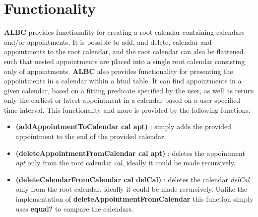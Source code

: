 \documentclass{IOS-Book-Article}
\begin{document}
\section{Functionality} \label{sec:functionality}
\textbf{ALBC} provides functionality for creating a root calendar containing calendars and/or appointments. It is possible to add, and delete, calendar and appointments to the root calendar, and the root calendar can also be flattened such that nested appointments are placed into a single root calendar consisting only of appointments. 
\textbf{ALBC} also provides functionality for presenting the appointments in a calendar within a html table. It can find appointments in a given calendar, based on a fitting predicate specified by the user, as well as return only the earliest or latest appointment in a calendar based on a user specified time interval. This functionality and more is provided by the following functions: 

\begin{itemize}
\item \textbf{(addAppointmentToCalendar cal apt)} : simply adds the provided appointment to the end of the provided calendar.
\item \textbf{(deleteAppointmentFromCalendar cal apt)} : deletes the appointment \textit{apt} only from the root calendar \textit{cal}, ideally it could be made recursively. 
\item \textbf{(deleteCalendarFromCalendar cal delCal)} : deletes the calendar \textit{delCal} only from the root calendar, ideally it could be made recursively. Unlike the implementation of \textbf{deleteAppointmentFromCalendar} this function simply uses \textbf{equal?} to compare the calendars.
\end{itemize}
\end{document}
